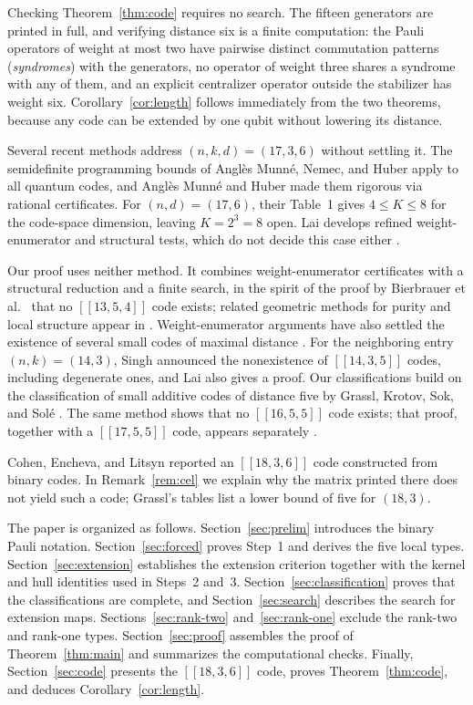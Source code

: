 \documentclass[11pt]{article}
\theoremstyle{definition}
\theoremstyle{remark}
\newcommand{\qc}[1]{[\![#1]\!]}
\begin{document}
Checking Theorem~\ref{thm:code} requires no search. The fifteen
generators are printed in full, and verifying distance six is a finite
computation: the Pauli operators of weight at most two have pairwise
distinct commutation patterns (\emph{syndromes}) with the generators, no
operator of weight three shares a syndrome with any of them, and an
explicit centralizer operator outside the stabilizer has weight six.
Corollary~\ref{cor:length} follows immediately from the two theorems,
because any code can be extended by one qubit without lowering its
distance.

Several recent methods address \((n,k,d)=(17,3,6)\) without settling it.
The semidefinite programming bounds of Angl\`es Munn\'e, Nemec, and
Huber \cite{mnh} apply to all quantum codes, and Angl\`es Munn\'e and
Huber \cite{sdp} made them rigorous via rational certificates. For
\((n,d)=(17,6)\), their Table~1 gives \(4\leq K\leq8\) for the
code-space dimension, leaving \(K=2^3=8\) open. Lai \cite{lai} develops
refined weight-enumerator and structural tests, which do not decide this
case either \cite[Section~\mbox{VII-D}]{lai}.

Our proof uses neither method. It combines weight-enumerator
certificates with a structural reduction and a finite search, in the spirit of the proof by
Bierbrauer et al.\ \cite{bierbrauer} that no \(\qc{13,5,4}\) code
exists; related geometric methods for purity and local structure appear
in \cite{geometry}. Weight-enumerator arguments have also settled the
existence of several small codes of maximal distance \cite{hgs,hg}. For
the neighboring entry \((n,k)=(14,3)\), Singh \cite{singh} announced the
nonexistence of \(\qc{14,3,5}\) codes, including degenerate ones, and
Lai \cite[Section~VII-C1]{lai} also gives a proof. Our classifications
build on the classification of small additive codes of distance five by
Grassl, Krotov, Sok, and Sol\'e \cite{dodeca}. The same method shows
that no \(\qc{16,5,5}\) code exists; that proof, together with a
\(\qc{17,5,5}\) code, appears separately \cite{li16}.

Cohen, Encheva, and Litsyn \cite{cel} reported an \(\qc{18,3,6}\) code
constructed from binary codes. In Remark~\ref{rem:cel} we explain why
the matrix printed there does not yield such a code; Grassl's tables
list a lower bound of five for \((18,3)\).

The paper is organized as follows. Section~\ref{sec:prelim} introduces
the binary Pauli notation. Section~\ref{sec:forced} proves Step~1 and
derives the five local types. Section~\ref{sec:extension} establishes
the extension criterion together with the kernel and hull identities
used in Steps~2 and~3. Section~\ref{sec:classification} proves that the
classifications are complete, and Section~\ref{sec:search} describes the
search for extension maps. Sections~\ref{sec:rank-two}
and~\ref{sec:rank-one} exclude the rank-two and rank-one types.
Section~\ref{sec:proof} assembles the proof of Theorem~\ref{thm:main}
and summarizes the computational checks. Finally, Section~\ref{sec:code}
presents the \(\qc{18,3,6}\) code, proves Theorem~\ref{thm:code}, and
deduces Corollary~\ref{cor:length}.
\end{document}
